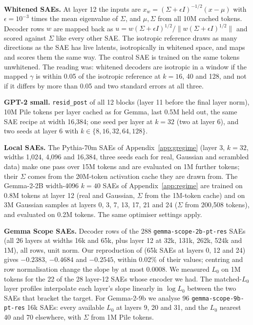 \documentclass[10pt,twocolumn]{article}
\newcommand{\Sig}{\Sigma}
\newcommand{\Lz}{L_0}
\begin{document}
\textbf{Whitened SAEs.} At layer 12 the inputs are $x_w = (\Sig+\epsilon I)^{-1/2}(x-\mu)$ with $\epsilon = 10^{-3}$ times the mean eigenvalue of $\Sig$, and $\mu,\Sig$ from all 10M cached tokens. Decoder rows $w$ are mapped back as $u = w(\Sig+\epsilon I)^{1/2}/\|w(\Sig+\epsilon I)^{1/2}\|$ and scored against $\Sig$ like every other SAE. The isotropic reference draws as many directions as the SAE has live latents, isotropically in whitened space, and maps and scores them the same way. The control SAE is trained on the same tokens unwhitened. The reading was: whitened decoders are isotropic in a window if the mapped $\gamma$ is within 0.05 of the isotropic reference at $k=16$, 40 and 128, and not if it differs by more than 0.05 and two standard errors at all three.

\textbf{GPT-2 small.} \texttt{resid\_post} of all 12 blocks (layer 11 before the final layer norm), 10M Pile tokens per layer cached as for Gemma, last 0.5M held out, the same SAE recipe at width 16,384; one seed per layer at $k=32$ (two at layer 6), and two seeds at layer 6 with $k \in \{8,16,32,64,128\}$.

\textbf{Local SAEs.} The Pythia-70m SAEs of Appendix~\ref{app:gregime} (layer 3, $k=32$, widths 1,024, 4,096 and 16,384, three seeds each for real, Gaussian and scrambled data) make one pass over 15M tokens and are evaluated on 1M further tokens; their $\Sig$ comes from the 20M-token activation cache they are drawn from. The Gemma-2-2B width-4096 $k=40$ SAEs of Appendix~\ref{app:regime} are trained on 0.8M tokens at layer 12 (real and Gaussian, $\Sig$ from the 1M-token cache) and on 3M Gaussian samples at layers 0, 3, 7, 13, 17, 21 and 24 ($\Sig$ from 200,508 tokens), and evaluated on 0.2M tokens. The same optimiser settings apply.

\textbf{Gemma Scope SAEs.} Decoder rows of the 288 \texttt{gemma-scope-2b-pt-res} SAEs (all 26 layers at widths 16k and 65k, plus layer 12 at 32k, 131k, 262k, 524k and 1M), all rows, unit norm. Our reproduction of \citet{li2025geometry} (65k SAEs at layers 0, 12 and 24) gives $-0.2383$, $-0.4684$ and $-0.2545$, within 0.02\% of their values; centring and row normalisation change the slope by at most 0.0008. We measured $\Lz$ on 1M tokens for the 22 of the 28 layer-12 SAEs whose encoder we had. The matched-$\Lz$ layer profiles interpolate each layer's slope linearly in $\log \Lz$ between the two SAEs that bracket the target. For Gemma-2-9b we analyse 96 \texttt{gemma-scope-9b-pt-res} 16k SAEs: every available $\Lz$ at layers 9, 20 and 31, and the $\Lz$ nearest 40 and 70 elsewhere, with $\Sig$ from 1M Pile tokens.
\end{document}
